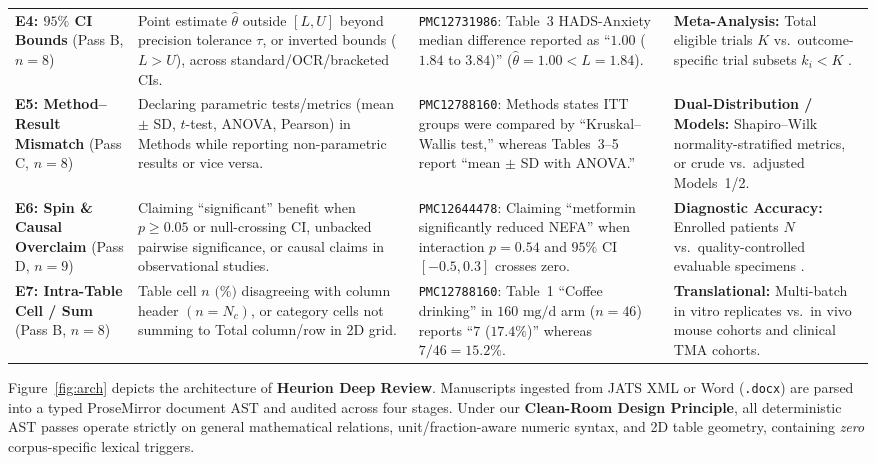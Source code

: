 \documentclass[11pt,a4paper]{article}
\begin{document}
\begin{table}[!t]
\begin{tabularx}{\textwidth}{@{}>{\raggedright\arraybackslash}p{2.25cm}>{\raggedright\arraybackslash}p{4.25cm}>{\raggedright\arraybackslash}X>{\raggedright\arraybackslash}p{3.85cm}@{}}
\addlinespace[2.5pt]
\textbf{E4: $95\%$ CI Bounds} (Pass B, $n=8$) & Point estimate $\hat{\theta}$ outside $[L, U]$ beyond precision tolerance $\tau$, or inverted bounds ($L > U$), across standard/OCR/bracketed CIs. & \texttt{PMC12731986}: Table~3 HADS-Anxiety median difference reported as ``$1.00$ ($1.84$ to $3.84$)'' ($\hat{\theta}=1.00 < L=1.84$). & \textbf{Meta-Analysis:} Total eligible trials $K$ vs.\ outcome-specific trial subsets $k_i < K$ \cite{page2021prisma}. \\
\addlinespace[2.5pt]
\textbf{E5: Method--Result Mismatch} (Pass C, $n=8$) & Declaring parametric tests/metrics (mean $\pm$ SD, $t$-test, ANOVA, Pearson) in Methods while reporting non-parametric results or vice versa. & \texttt{PMC12788160}: Methods states ITT groups were compared by ``Kruskal--Wallis test,'' whereas Tables~3--5 report ``mean $\pm$ SD with ANOVA.'' & \textbf{Dual-Distribution / Models:} Shapiro--Wilk normality-stratified metrics, or crude vs.\ adjusted Models~1/2. \\
\addlinespace[2.5pt]
\textbf{E6: Spin \& Causal Overclaim} (Pass D, $n=9$) & Claiming ``significant'' benefit when $p \ge 0.05$ or null-crossing CI, unbacked pairwise significance, or causal claims in observational studies. & \texttt{PMC12644478}: Claiming ``metformin significantly reduced NEFA'' when interaction $p = 0.54$ and $95\%$ CI $[-0.5, 0.3]$ crosses zero. & \textbf{Diagnostic Accuracy:} Enrolled patients $N$ vs.\ quality-controlled evaluable specimens \cite{bossuyt2015stard}. \\
\addlinespace[2.5pt]
\textbf{E7: Intra-Table Cell / Sum} (Pass B, $n=8$) & Table cell $n\text{ (\%)}$ disagreeing with column header $(n=N_c)$, or category cells not summing to Total column/row in 2D grid. & \texttt{PMC12788160}: Table~1 ``Coffee drinking'' in $160\text{ mg/d}$ arm ($n=46$) reports ``$7$ ($17.4\%$)'' whereas $7/46 = 15.2\%$. & \textbf{Translational:} Multi-batch in vitro replicates vs.\ in vivo mouse cohorts and clinical TMA cohorts. \\
\bottomrule
\end{tabularx}
\end{table}

Figure~\ref{fig:arch} depicts the architecture of \textbf{Heurion Deep Review}. Manuscripts ingested from JATS XML or Word (\texttt{.docx}) are parsed into a typed ProseMirror document AST and audited across four stages. Under our \textbf{Clean-Room Design Principle}, all deterministic AST passes operate strictly on general mathematical relations, unit/fraction-aware numeric syntax, and 2D table geometry, containing \emph{zero} corpus-specific lexical triggers.
\end{document}
